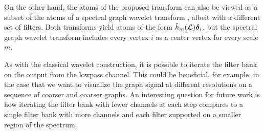 \documentclass[journal, 10pt]{IEEEtran}
\begin{document}
On the other hand, the atoms of the proposed transform can also be viewed as a subset of the atoms of a spectral graph wavelet transform  \cite{hammond2011wavelets}, albeit with a different set of filters. Both transforms yield atoms of the form $\tilde{h}_m(\boldsymbol{\mathcal{L}}){\boldsymbol \delta}_i$, but the spectral graph wavelet transform includes every vertex $i$ as a center vertex for every scale $m$. 


As with the classical wavelet construction, it is possible to iterate the filter bank on the output from the lowpass channel.
This could be beneficial, for example, in the case that we want to visualize the graph signal at different resolutions on  a sequence of coarser and coarser graphs. An interesting question for future work is how iterating the filter bank with fewer channels at each step compares to a single filter bank with more channels and each filter supported on a smaller region of the spectrum.

\balance

{\small }
\end{document}
